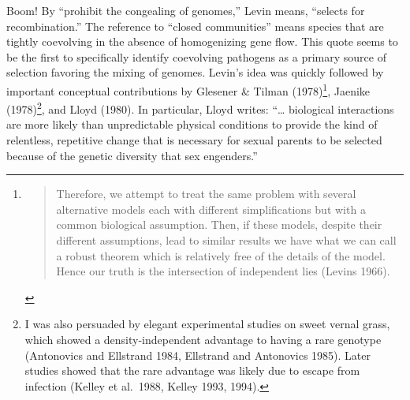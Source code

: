 \documentclass[
  letterpaper,
]{book}
\begin{document}
Boom! By ``prohibit the congealing of genomes,'' Levin means, ``selects
for recombination.'' The reference to ``closed communities'' means
species that are tightly coevolving in the absence of homogenizing gene
flow. This quote seems to be the first to specifically identify
coevolving pathogens as a primary source of selection favoring the
mixing of genomes. Levin's idea was quickly followed by important
conceptual contributions by Glesener \& Tilman (1978)\footnote{\begin{quote}
  Therefore, we attempt to treat the same problem with several
  alternative models each with different simplifications but with a
  common biological assumption. Then, if these models, despite their
  different assumptions, lead to similar results we have what we can
  call a robust theorem which is relatively free of the details of the
  model. Hence our truth is the intersection of independent lies (Levins
  1966).
  \end{quote}}, Jaenike (1978)\footnote{I was also persuaded by elegant
  experimental studies on sweet vernal grass, which showed a
  density-independent advantage to having a rare genotype (Antonovics
  and Ellstrand 1984, Ellstrand and Antonovics 1985). Later studies
  showed that the rare advantage was likely due to escape from infection
  (Kelley et al.~1988, Kelley 1993, 1994).}, and Lloyd (1980). In
particular, Lloyd writes: ``\ldots{} biological interactions are more
likely than unpredictable physical conditions to provide the kind of
relentless, repetitive change that is necessary for sexual parents to be
selected because of the genetic diversity that sex engenders.''
\end{document}
